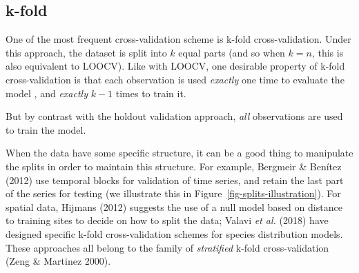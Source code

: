 \documentclass[
  letterpaper,
]{scrbook}
\begin{document}
\subsection{k-fold}\label{sec-crossvalidation-kfolds}

One of the most frequent cross-validation scheme is k-fold
cross-validation. Under this approach, the dataset is split into \(k\)
equal parts (and so when \(k = n\), this is also equivalent to LOOCV).
Like with LOOCV, one desirable property of k-fold cross-validation is
that each observation is used \emph{exactly} one time to evaluate the
model , and \emph{exactly} \(k-1\) times to train it.

But by contrast with the holdout validation approach, \emph{all}
observations are used to train the model.

When the data have some specific structure, it can be a good thing to
manipulate the splits in order to maintain this structure. For example,
Bergmeir \& Benítez (2012) use temporal blocks for validation of time
series, and retain the last part of the series for testing (we
illustrate this in Figure~\ref{fig-splits-illustration}). For spatial
data, Hijmans (2012) suggests the use of a null model based on distance
to training sites to decide on how to split the data; Valavi \emph{et
al.} (2018) have designed specific k-fold cross-validation schemes for
species distribution models. These approaches all belong to the family
of \emph{stratified} k-fold cross-validation (Zeng \& Martinez 2000).
\end{document}
